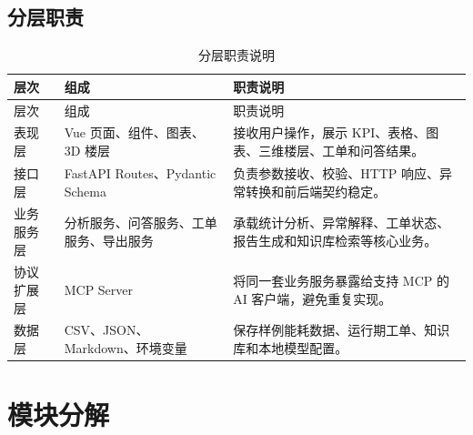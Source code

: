 \documentclass[12pt,a4paper]{ctexart}
\begin{document}
\subsection{分层职责}
\begin{longtable}{L{2.8cm}L{4.5cm}L{6.7cm}}
\caption{分层职责说明}\\
\toprule
层次 & 组成 & 职责说明 \\
\midrule
\endfirsthead
\toprule
层次 & 组成 & 职责说明 \\
\midrule
\endhead
表现层 & Vue 页面、组件、图表、3D 楼层 & 接收用户操作，展示 KPI、表格、图表、三维楼层、工单和问答结果。 \\
接口层 & FastAPI Routes、Pydantic Schema & 负责参数接收、校验、HTTP 响应、异常转换和前后端契约稳定。 \\
业务服务层 & 分析服务、问答服务、工单服务、导出服务 & 承载统计分析、异常解释、工单状态、报告生成和知识库检索等核心业务。 \\
协议扩展层 & MCP Server & 将同一套业务服务暴露给支持 MCP 的 AI 客户端，避免重复实现。 \\
数据层 & CSV、JSON、Markdown、环境变量 & 保存样例能耗数据、运行期工单、知识库和本地模型配置。 \\
\bottomrule
\end{longtable}

\section{模块分解}
\end{document}
